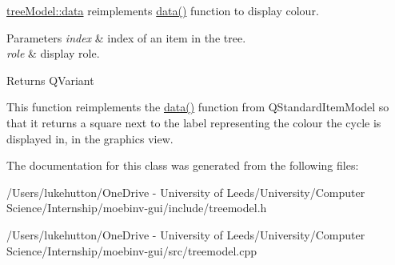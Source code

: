 \mbox{\hyperlink{classtree_model_add38ff680cd2a926d201c0760234419d}{tree\+Model\+::data}} reimplements \mbox{\hyperlink{classtree_model_add38ff680cd2a926d201c0760234419d}{data()}} function to display colour. 


\begin{DoxyParams}{Parameters}
{\em index} & index of an item in the tree. \\
\hline
{\em role} & display role. \\
\hline
\end{DoxyParams}
\begin{DoxyReturn}{Returns}
Q\+Variant
\end{DoxyReturn}
This function reimplements the \mbox{\hyperlink{classtree_model_add38ff680cd2a926d201c0760234419d}{data()}} function from Q\+Standard\+Item\+Model so that it returns a square next to the label representing the colour the cycle is displayed in, in the graphics view. 

The documentation for this class was generated from the following files\+:\begin{DoxyCompactItemize}
\item 
/\+Users/lukehutton/\+One\+Drive -\/ University of Leeds/\+University/\+Computer Science/\+Internship/moebinv-\/gui/include/treemodel.\+h\item 
/\+Users/lukehutton/\+One\+Drive -\/ University of Leeds/\+University/\+Computer Science/\+Internship/moebinv-\/gui/src/treemodel.\+cpp\end{DoxyCompactItemize}
